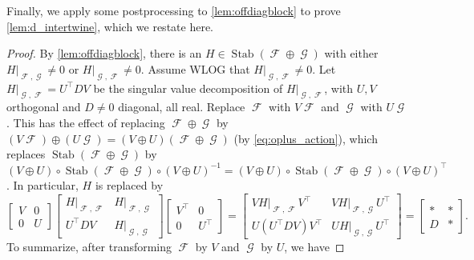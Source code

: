 \documentclass{theoretics}
\DeclareMathOperator{\rr}{\mathbb{R}}
\DeclareMathOperator{\fc}{\mathcal{F}}
\DeclareMathOperator{\gc}{\mathcal{G}}
\DeclareMathOperator{\stab}{Stab}
\begin{document}
Finally, we apply some postprocessing to \autoref{lem:offdiagblock} to
prove \autoref{lem:d_intertwine}, which we restate here.
\intertwinelemma*
\begin{proof}
    By \autoref{lem:offdiagblock}, there is an $H \in \stab(\fc\oplus\gc)$
    with either $H|_{\fc,\gc} \neq 0$ or $H|_{\gc,\fc} \neq 0$. Assume WLOG that $H|_{\gc,\fc} \neq 0$.
    Let $H|_{\gc,\fc} = U^\top D V$ be the singular value decomposition of $H|_{\gc,\fc}$, with
    $U,V$ orthogonal and $D \neq 0$ diagonal, all real. 
    Replace $\fc$ with $V \fc$ and $\gc$ with $U \gc$.
    This has the effect of replacing $\fc \oplus \gc$ by
    $(V\fc)\oplus (U \gc) = (V \oplus U)(\fc \oplus \gc)$ (by \eqref{eq:oplus_action}),
    which replaces
    $\stab(\fc\oplus\gc)$ by $(V \oplus U) \circ \stab(\fc\oplus\gc) \circ 
    (V \oplus U)^{-1} = (V \oplus U) \circ \stab(\fc\oplus\gc) \circ 
    (V \oplus U)^\top$. In particular, $H$ is replaced by
    \[
        \begin{bmatrix} V & 0 \\ 0 & U \end{bmatrix} 
        \begin{bmatrix} H|_{\fc,\fc} & H|_{\fc,\gc} \\ U^\top DV & H|_{\gc,\gc} \end{bmatrix}
        \begin{bmatrix} V^\top & 0 \\ 0 & U^\top \end{bmatrix} =
        \begin{bmatrix} VH|_{\fc,\fc}V^\top & VH|_{\fc,\gc}U^\top \\ U(U^\top DV) V^\top & U H|_{\gc,\gc} U^\top \end{bmatrix}
        = \begin{bmatrix} * & * \\ D & * \end{bmatrix}.
    \]
    To summarize, after transforming $\fc$ by $V$ and $\gc$ by $U$, we have

\end{proof}
\end{document}
